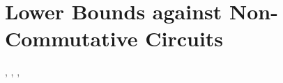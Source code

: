 \chapter{Lower Bounds against Non-Commutative Circuits}
\label{chap:nc-ckts}

\cite{CH23}, \cite{Sha26a}, \cite{Raz26}, \cite{Sha26b}


